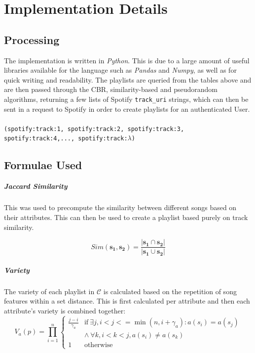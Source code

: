 \documentclass[a4paper, 12pt]{report}
\begin{document}
\chapter{Implementation Details}
\section{Processing}
The implementation is written in \emph{Python}. This is due to a large amount of useful libraries available for the language such as \emph{Pandas} and \emph{Numpy}, as well as for quick 
writing and readability. 
The playlists are queried from the tables above and are then passed through the CBR, similarity-based and pseudorandom algorithms, returning a few lists of Spotify \texttt{track\_uri} strings, 
which can then be sent in a request to Spotify in order to create playlists for an authenticated User.
\\
\\
\texttt{(spotify:track:1, spotify:track:2, spotify:track:3, spotify:track:4,..., spotify:track:\(\lambda\))}

\section{Formulae Used}\cite[pp. 5--10]{main}
\paragraph{Jaccard Similarity}
This was used to precompute the similarity between different songs based on their attributes. 
This can then be used to create a playlist based purely on track similarity.

\[Sim(\bm{s_1}, \bm{s_2}) = \frac{|\bm{s_1} \cap \bm{s_2}|}{|\bm{s_1} \cup \bm{s_2}|}\]

\paragraph{Variety}
The variety of each playlist in \(\mathcal{C}\) is calculated based on the repetition of song features within a set distance. 
This is first calculated per attribute and then each attribute's variety is combined together:
\begin{equation}
V_a(p) = \prod_{i=1}^n
\begin{cases}
    \frac{j-i}{\gamma_a} & \text{if}\ \exists j, i < j <= \min(n, i+\gamma_a) : a(s_i) = a(s_j) \\
    & \wedge\ \forall k, i < k < j, a(s_i) \neq a(s_k) \\
    1 & \text{otherwise}
\end{cases}
\end{equation}
\end{document}
